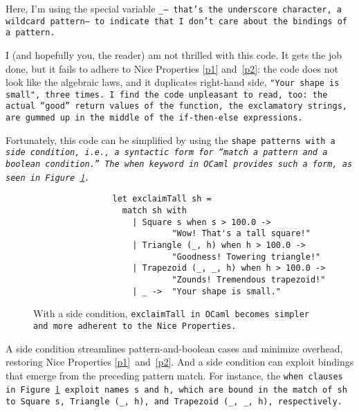 \documentclass[manuscript,screen,review, 12pt, nonacm]{acmart}
\begin{document}
    Here, I'm using the special variable \tt{\_}--- that's the underscore
    character, a wildcard pattern--- to indicate that I don't care about the
    bindings of a pattern. 

    I (and hopefully you, the reader) am not thrilled with this code. It gets
    the job done, but it fails to adhere to Nice Properties \ref{p1}
    and~\ref{p2}: the code does not look like the algebraic laws, and it
    duplicates right-hand side, \tt{"Your shape is small"}, three times. I find
    the code unpleasant to read, too: the actual “good” return values of the
    function, the exclamatory strings, are gummed up in the middle of the
    \tt{if-then-else} expressions.
    
    Fortunately, this code can be simplified by using the \tt{shape} patterns
    with a \it{side condition}, i.e., a syntactic form for “match a pattern
    \it{and} a boolean condition.” The \tt{when} keyword in OCaml provides such
    a form, as seen in Figure~\ref{fig:whenexclaimtall}.
        
        \begin{figure}[]
            \begin{verbatim}
                let exclaimTall sh =
                  match sh with 
                    | Square s when s > 100.0 ->
                            "Wow! That's a tall square!"
                    | Triangle (_, h) when h > 100.0 ->
                            "Goodness! Towering triangle!"
                    | Trapezoid (_, _, h) when h > 100.0 -> 
                            "Zounds! Tremendous trapezoid!"
                    | _ ->  "Your shape is small." 
                \end{verbatim}
            \caption{With a side condition, \tt{exclaimTall} in OCaml becomes
            simpler and more adherent to the Nice Properties.} 
            \label{fig:whenexclaimtall}
        \end{figure}

    A side condition streamlines pattern-and-boolean cases and minimize
    overhead, restoring Nice Properties \ref{p1}~and~\ref{p2}. And a side
    condition can exploit bindings that emerge from the preceding pattern match.
    For instance, the \tt{when} clauses in Figure~\ref{fig:whenexclaimtall}
    exploit names \tt{s} and \tt{h}, which are bound in the match of \tt{sh} to
    \tt{Square s}, \tt{Triangle (\_, h)}, and \tt{Trapezoid (\_, \_, h)},
    respectively. 
\end{document}
